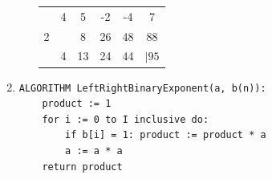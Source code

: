 \documentclass[a4paper,10pt]{article}
\begin{document}
\begin{enumerate}
\begin{enumerate}[(a)]
\begin{tabular}{c|ccccc}
	& 4 & 5 & -2 & -4 & 7\\
	2 & & 8 & 26 & 48 & 88\\
	\hline
	& 4 & 13 & 24 & 44 & $|95$
\end{tabular}
\end{enumerate}

\item \begin{lstlisting}
ALGORITHM LeftRightBinaryExponent(a, b(n)):
	product := 1
	for i := 0 to I inclusive do:
		if b[i] = 1: product := product * a
		a := a * a
	return product
\end{lstlisting}
\end{enumerate}
\end{document}
